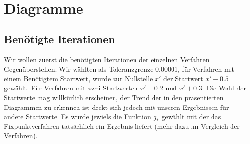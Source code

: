 \documentclass[a4paper,12pt]{article}
\newcommand{\1}{1\hspace{-0,9ex}1}
\begin{document}
\section*{Diagramme}
\subsection*{Benötigte Iterationen}
Wir wollen zuerst die benötigten Iterationen der einzelnen Verfahren Gegenüberstellen. Wir wählten als Toleranzgrenze 0.00001, für Verfahren mit einem Benötigtem Startwert, wurde zur Nullstelle $x'$ der Startwert $x'-0.5$ gewählt. Für Verfahren mit zwei Startwerten $x'-0.2$ und $x'+0.3$. Die Wahl der Startwerte mag willkürlich erscheinen, der Trend der in den präsentierten Diagrammen zu erkennen ist deckt sich jedoch mit unseren Ergebnissen für andere Startwerte. Es wurde jewiels die Funktion $g_*$ gewählt mit der das Fixpunktverfahren tatsächlich ein Ergebnis liefert (mehr dazu im Vergleich der Verfahren).
\end{document}
